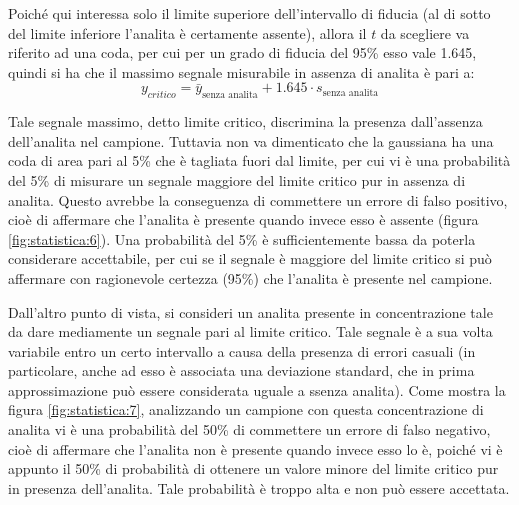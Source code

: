 Poiché qui interessa solo il limite superiore dell'intervallo di fiducia (al di sotto del limite inferiore l'analita è certamente assente), allora il $t$ da scegliere va riferito ad una coda, per cui per un grado di fiducia del 95\% esso vale 1.645, quindi si ha che il massimo segnale misurabile in assenza di analita è pari a:
\begin{equation} \label{eq:statistica:33}
y_{critico} = \bar{y}_{\text{senza analita}} + 1.645 \cdot s_{\text{senza analita}}
\end{equation}


Tale segnale massimo, detto limite critico, discrimina la presenza dall'assenza dell'analita nel campione. Tuttavia non va dimenticato che la gaussiana ha una coda di area pari al 5\% che è tagliata fuori dal limite, per cui vi è una probabilità del 5\% di misurare un segnale maggiore del limite critico pur in assenza di analita. Questo avrebbe la conseguenza di commettere un errore di falso positivo, cioè di affermare che l'analita è presente quando invece esso è assente (figura \ref{fig:statistica:6}). Una probabilità del 5\% è sufficientemente bassa da poterla considerare accettabile, per cui se il segnale è maggiore del limite critico si può affermare con ragionevole certezza (95\%) che l'analita è presente nel campione.

Dall'altro punto di vista, si consideri un analita presente in concentrazione tale da dare mediamente un segnale pari al limite critico. Tale segnale è a sua volta variabile entro un certo intervallo a causa della presenza di errori casuali (in particolare, anche ad esso è associata una deviazione standard, che in prima approssimazione può essere considerata uguale a ssenza analita). Come mostra la figura \ref{fig:statistica:7}, analizzando un campione con questa concentrazione di analita vi è una probabilità del 50\% di commettere un errore di falso negativo, cioè di affermare che l'analita non è presente quando invece esso lo è, poiché vi è appunto il 50\% di probabilità di ottenere un valore minore del limite critico pur in presenza dell'analita. Tale probabilità è troppo alta e non può essere accettata.


